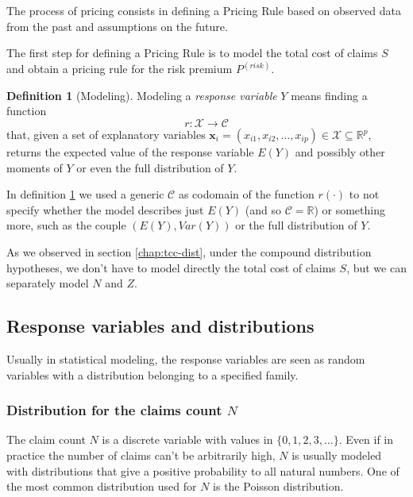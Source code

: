 \documentclass[a4paper, twoside, openright, 12pt]{report}
\theoremstyle{definition}
\newtheorem{definition}{Definition}[chapter]
\theoremstyle{definition}
\theoremstyle{definition}
\theoremstyle{remark}
\begin{document}
The process of pricing consists in defining a Pricing Rule based on observed data from the past and assumptions on the future.

The first step for defining a Pricing Rule is to model the total cost of claims \(S\) and obtain a pricing rule for the risk premium \(P^{(risk)}\).

\begin{definition}[Modeling]
\label{def:modeling} \iffalse (Modeling) \fi{} Modeling a \emph{response variable} \(Y\) means finding a function
\[r:\mathcal{X}\rightarrow \mathcal{C}\]
that, given a set of explanatory variables \(\boldsymbol{x}_i=(x_{i1}, x_{i2}, \dots, x_{ip})\in \mathcal{X} \subseteq \mathbb{R}^p\), returns the expected value of the response variable \(E(Y)\) and possibly other moments of \(Y\) or even the full distribution of \(Y\).
\end{definition}

In definition \ref{def:modeling} we used a generic \(\mathcal{C}\) as codomain of the function \(r(\cdot)\) to not specify whether the model describes just \(E(Y)\) (and so \(\mathcal{C}=\mathbb{R}\)) or something more, such as the couple \(\left( E(Y), Var(Y) \right)\) or the full distribution of \(Y\).

As we observed in section \ref{chap:tcc-dist}, under the compound distribution hypotheses, we don't have to model directly the total cost of claims \(S\), but we can separately model \(N\) and \(Z\).

\hypertarget{chap:response-variables-and-distributions}{%
\subsection{Response variables and distributions}\label{chap:response-variables-and-distributions}}

Usually in statistical modeling, the response variables are seen as random variables with a distribution belonging to a specified family.

\hypertarget{chap:dist-n}{%
\subsubsection{\texorpdfstring{Distribution for the claims count \(N\)}{Distribution for the claims count N}}\label{chap:dist-n}}

The claim count \(N\) is a discrete variable with values in \(\{0, 1, 2, 3,\dots\}\). Even if in practice the number of claims can't be arbitrarily high, \(N\) is usually modeled with distributions that give a positive probability to all natural numbers. One of the most common distribution used for \(N\) is the Poisson distribution.
\end{document}
